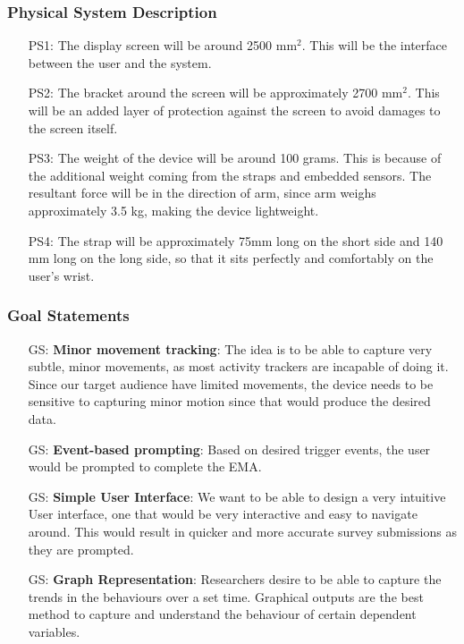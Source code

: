 \documentclass[12pt]{article}
\newcounter{goalnum} %
\begin{document}
\subsubsection{Physical System Description} \label{sec_phySystDescrip}



\begin{itemize}

  \item[PS1:] The display screen will be around 2500 mm$^2$. This will be the interface between the user and the system.
  \item[PS2:] The bracket around the screen will be approximately 2700 mm$^2$. This will be an added layer of protection against the screen to avoid damages to the screen itself.
  \item[PS3:] The weight of the device will be around 100 grams. This is because of the additional weight coming from the straps and embedded sensors. The resultant force will be in the direction of arm, since arm weighs approximately 3.5 kg, making the device lightweight.
  \item[PS4:] The strap will be approximately 75mm long on the short side and 140 mm long on the long side, so that it sits perfectly and comfortably on the user's wrist.

\end{itemize}


\subsubsection{Goal Statements}
\begin{itemize}

  \item[GS\refstepcounter{goalnum}\thegoalnum \label{G_meaningfulLabel}:] \textbf{Minor movement tracking}: The idea is to be able to capture very subtle, minor movements, as most activity trackers are incapable of doing it. Since our target audience have limited movements, the device needs to be sensitive to capturing minor motion since that would produce the desired data.
  \item[GS\refstepcounter{goalnum}\thegoalnum \label{G_meaningfulLabel}:] \textbf{Event-based prompting}: Based on desired trigger events, the user would be prompted to complete the EMA.
  \item[GS\refstepcounter{goalnum}\thegoalnum \label{G_meaningfulLabel}:] \textbf{Simple User Interface}: We want to be able to design a very intuitive User interface, one that would be very interactive and easy to navigate around. This would result in quicker and more accurate survey submissions as they are prompted.
  \item[GS\refstepcounter{goalnum}\thegoalnum \label{G_meaningfulLabel}:] \textbf{Graph Representation}: Researchers desire to be able to capture the trends in the behaviours over a set time. Graphical outputs are the best method to capture and understand the behaviour of certain dependent variables.

\end{itemize}
\end{document}
